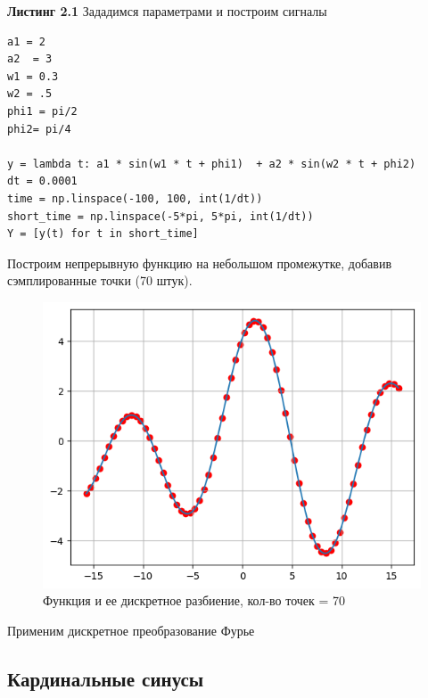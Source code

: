 \noindent \textbf{Листинг 2.1} Зададимся параметрами и построим сигналы 
\begin{lstlisting}
a1 = 2
a2  = 3
w1 = 0.3
w2 = .5
phi1 = pi/2
phi2= pi/4

y = lambda t: a1 * sin(w1 * t + phi1)  + a2 * sin(w2 * t + phi2)
dt = 0.0001
time = np.linspace(-100, 100, int(1/dt))
short_time = np.linspace(-5*pi, 5*pi, int(1/dt))
Y = [y(t) for t in short_time]
\end{lstlisting}
\noindent Построим непрерывную функцию на небольшом промежутке, добавив сэмплированные точки (70 штук).
\begin{figure}[!htb]
    \centering
    \includegraphics[scale=0.7]{../img/1_samples}
    \caption{Функция и ее дискретное разбиение, кол-во точек = 70}
\end{figure}

\noindent Применим дискретное преобразование Фурье 

\subsection{Кардинальные синусы}


